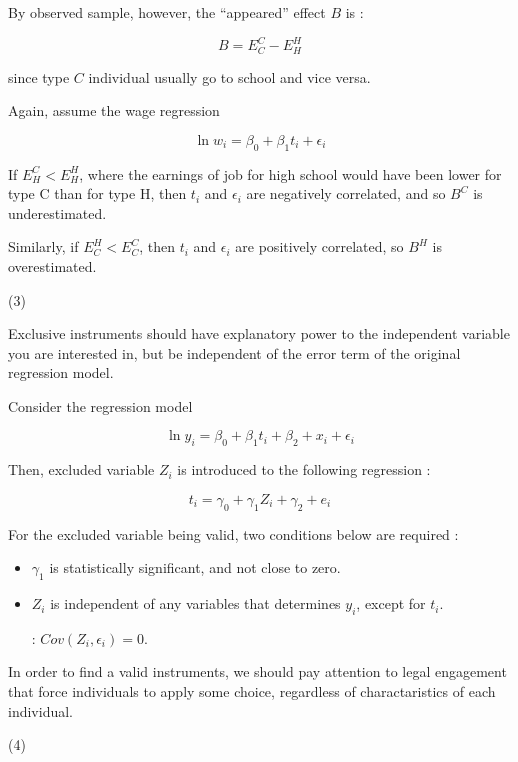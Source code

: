 \documentclass[dvipdfmx]{jsarticle}
\begin{document}
\begin{enumerate}
\begin{itemize}
  By observed sample, however, the ``appeared'' effect $B$ is :
  
  \[ B = E_C^C - E_H^H \]
  
  since type $C$ individual usually go to school and vice versa.
  
  Again, assume the wage regression
  
  \[ \ln w_i = \beta_0 + \beta_1 t_i + \epsilon_i \]
  
  If $E_H^C < E_H^H$, where the earnings of job for high school would have been lower for type C than for type H, then $t_i$ and $\epsilon_i$ are negatively correlated, and so $B^C$ is underestimated.
  
  Similarly, if $E_C^H < E_C^C$, then $t_i$ and $\epsilon_i$ are positively correlated, so $B^H$ is overestimated.
  
  \end{itemize}
 
 (3)
 
 Exclusive instruments should have explanatory power to the independent variable you are interested in, but be independent of the error term of the original regression model.
 
 Consider the regression model
 
 \[ \ln y_i = \beta_0 + \beta_1 t_i + \beta_2 + x_i + \epsilon_i \]
 
 Then, excluded variable $Z_i$ is introduced to the following regression :
 
 \[t_i = \gamma_0 + \gamma_1 Z_i + \gamma_2 + e_i \]
 
 For the excluded variable being valid, two conditions below are required :
 
  \begin{itemize}
  
  \item $\gamma_1$ is statistically significant, and not close to zero.
  
  \item $Z_i$ is independent of any variables that determines $y_i$, except for $t_i$.
  
  : $Cov(Z_i, \epsilon_i) = 0$.
  
  \end{itemize} 
 
 In order to find a valid instruments, we should pay attention to legal engagement that force individuals to apply some choice, regardless of charactaristics of each individual. 
 
 (4)
 

\end{enumerate}
\end{document}
